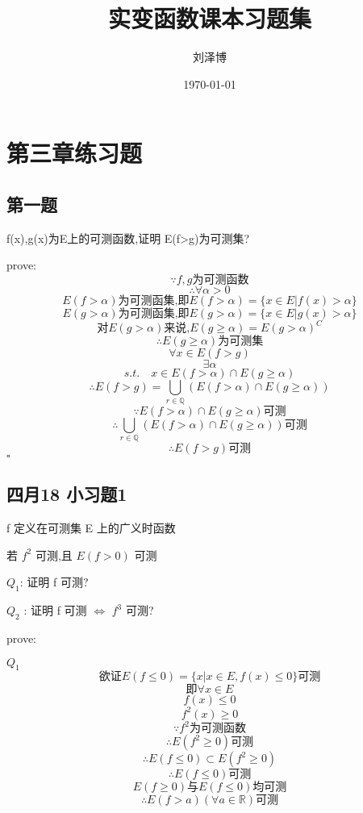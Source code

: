 \documentclass[a4paper]{article}
\title{实变函数课本习题集}
\author{刘泽博}
\date{\today}
\begin{document}
    \maketitle
    \tableofcontents
    \section{第三章练习题}    
    \subsection{第一题}

    f(x),g(x)为E上的可测函数,证明 E(f>g)为可测集?

    prove:
    \[\because f,g\text{为可测函数}\]
    \[\therefore \forall \alpha >0\]
    \[E(f>\alpha)\text{为可测函集,即}E(f>\alpha)=\{x\in E | f(x)>\alpha\}\]
    \[E(g>\alpha)\text{为可测函集,即}E(g>\alpha)=\{x\in E | g(x)>\alpha\}\]
    \[\text{对}E(g>\alpha)\text{来说,}E(g\ge\alpha)=E(g>\alpha)^C\]
    \[\therefore E(g\ge\alpha)\text{为可测集}\]
    \[\forall x \in E(f>g)\]
    \[\exists \alpha\]
    \[s.t. \quad x\in E(f>\alpha) \cap E(g \ge \alpha)\]
    \[\therefore E(f>g)=\bigcup_{r\in \mathbb{Q}}(E(f>\alpha)\cap E(g\ge \alpha))\]
    \[\because E(f>\alpha)\cap E(g\ge\alpha)\text{可测}\]
    \[\therefore \bigcup_{r\in \mathbb{Q}}(E(f>\alpha)\cap E(g\ge \alpha))\text{可测}\]
    \[\therefore E(f>g)\text{可测}\]
    \hfill $\square$

    \subsection{四月18 小习题1}
    
    f 定义在可测集 E 上的广义时函数

    若 $f^2$ 可测,且 $E(f>0)$ 可测

    $Q_1$: 证明 f 可测?

    $Q_2$ : 证明 f 可测 $\Leftrightarrow$ $f^3$ 可测?

    prove:
    
    $Q_1$
    \[\text{欲证} E(f \le 0)=\{x|x\in E,f(x) \le 0\}\text{可测}\]
    \[\text{即} \forall x \in E\]
    \[f(x)\le 0\]
    \[f^2(x)\ge 0\]
    \[\because f^2 \text{为可测函数}\]
    \[\therefore E(f^2\ge 0)\text{可测}\]
    \[\therefore E(f\le 0)\subset E(f^2\ge 0)\]
    \[\therefore E(f\le 0)\text{可测}\]
    \[E(f\ge 0)\text{与}E(f\le 0)\text{均可测}\]
    \[\therefore E(f>a)(\forall a \in \mathbb{R})\text{可测}\]



    
\end{document}

